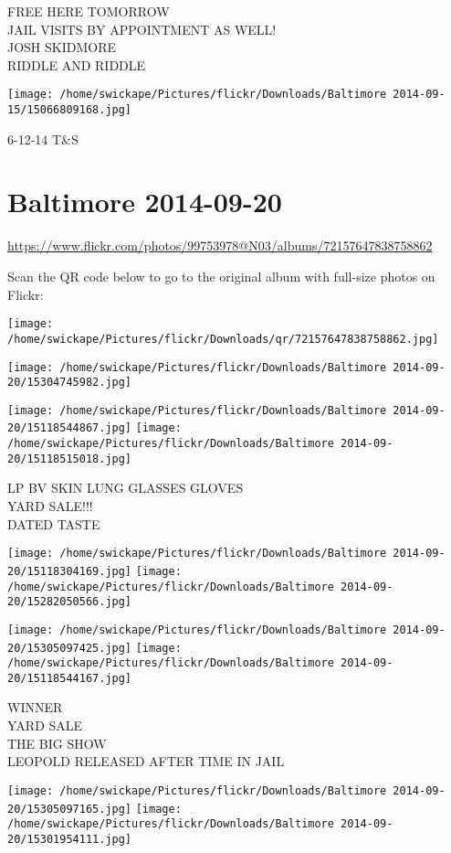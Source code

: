 \documentclass[10pt,letterpaper]{article}
\begin{document}
FREE HERE TOMORROW\\
JAIL VISITS BY APPOINTMENT AS WELL!\\
JOSH SKIDMORE\\
RIDDLE AND RIDDLE
\pagebreak

\texttt{[image: /home/swickape/Pictures/flickr/Downloads/Baltimore 2014-09-15/15066809168.jpg]}

6{-}12{-}14 T\&S
\pagebreak

\section*{Baltimore 2014-09-20}

\url{https://www.flickr.com/photos/99753978@N03/albums/72157647838758862}

Scan the QR code below to go to the original album with full-size photos on Flickr:

\texttt{[image: /home/swickape/Pictures/flickr/Downloads/qr/72157647838758862.jpg]}
\pagebreak

\texttt{[image: /home/swickape/Pictures/flickr/Downloads/Baltimore 2014-09-20/15304745982.jpg]}

\vspace{0.25in}
\texttt{[image: /home/swickape/Pictures/flickr/Downloads/Baltimore 2014-09-20/15118544867.jpg]}
\texttt{[image: /home/swickape/Pictures/flickr/Downloads/Baltimore 2014-09-20/15118515018.jpg]}

LP BV SKIN LUNG GLASSES GLOVES\\
YARD SALE!!!\\
DATED TASTE
\pagebreak

\texttt{[image: /home/swickape/Pictures/flickr/Downloads/Baltimore 2014-09-20/15118304169.jpg]}
\texttt{[image: /home/swickape/Pictures/flickr/Downloads/Baltimore 2014-09-20/15282050566.jpg]}

\texttt{[image: /home/swickape/Pictures/flickr/Downloads/Baltimore 2014-09-20/15305097425.jpg]}
\texttt{[image: /home/swickape/Pictures/flickr/Downloads/Baltimore 2014-09-20/15118544167.jpg]}

WINNER\\
YARD SALE\\
THE BIG SHOW\\
LEOPOLD RELEASED AFTER TIME IN JAIL
\pagebreak

\texttt{[image: /home/swickape/Pictures/flickr/Downloads/Baltimore 2014-09-20/15305097165.jpg]}
\texttt{[image: /home/swickape/Pictures/flickr/Downloads/Baltimore 2014-09-20/15301954111.jpg]}
\end{document}
